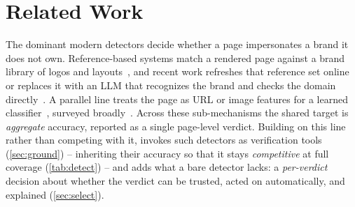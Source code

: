\section{Related Work}
\label{sec:related}

The dominant modern detectors decide whether a page impersonates a brand it does
not own. Reference-based systems match a rendered page against a brand library of
logos and layouts~\cite{abdelnabi2020visualphishnet,lin2021phishpedia,
liu2022phishintention}, and recent work refreshes that reference set
online~\cite{dynaphish2023} or replaces it with an LLM that recognizes the brand
and checks the domain directly~\cite{tan2024phishllm,li2024knowphish}. A parallel
line treats the page as URL or image features for a learned
classifier~\cite{diffusion2025phishing,aljofey2026hybrid}, surveyed
broadly~\cite{slr2023phishing}. Across these sub-mechanisms the shared target is
\emph{aggregate} accuracy, reported as a single page-level verdict. Building on this
line rather than competing with it, \toolname{} invokes such detectors as verification
tools (\autoref{sec:ground}) -- inheriting their accuracy so that it stays
\emph{competitive} at full coverage (\autoref{tab:detect}) -- and adds what a bare
detector lacks: a \emph{per-verdict} decision about whether the verdict can be trusted,
acted on automatically, and explained (\autoref{sec:select}).

